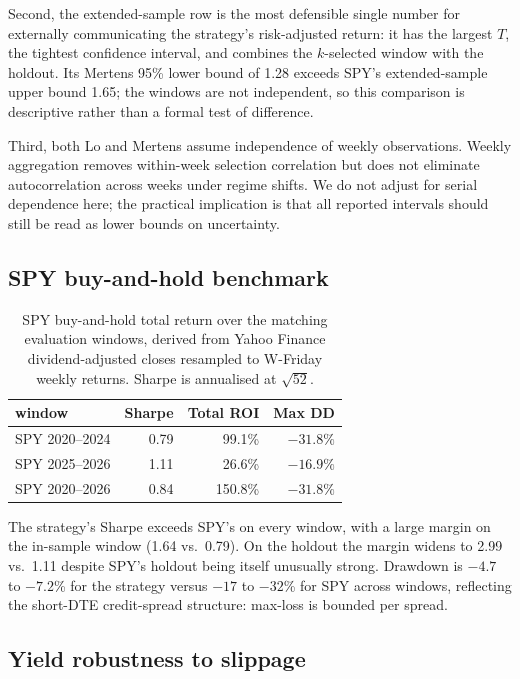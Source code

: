 \documentclass[11pt]{article}
\begin{document}
Second, the extended-sample row is the most defensible single number
for externally communicating the strategy's risk-adjusted return: it
has the largest $T$, the tightest confidence interval, and combines
the $k$-selected window with the holdout. Its Mertens 95\% lower
bound of 1.28 exceeds SPY's extended-sample upper bound 1.65; the
windows are not independent, so this comparison is descriptive rather
than a formal test of difference.

Third, both Lo and Mertens assume independence of weekly observations.
Weekly aggregation removes within-week selection correlation but does
not eliminate autocorrelation across weeks under regime shifts. We do
not adjust for serial dependence here; the practical implication is
that all reported intervals should still be read as lower bounds on
uncertainty.

\subsection{SPY buy-and-hold benchmark}

\begin{table}[htbp]
\centering
\small
\begin{tabular}{lrrr}
\toprule
window & Sharpe & Total ROI & Max DD \\
\midrule
SPY 2020--2024 & 0.79 & 99.1\%  & $-31.8\%$ \\
SPY 2025--2026 & 1.11 & 26.6\%  & $-16.9\%$ \\
SPY 2020--2026 & 0.84 & 150.8\% & $-31.8\%$ \\
\bottomrule
\end{tabular}
\caption{SPY buy-and-hold total return over the matching evaluation
windows, derived from Yahoo Finance dividend-adjusted closes resampled
to W-Friday weekly returns. Sharpe is annualised at $\sqrt{52}$.}
\label{tab:spy-benchmark}
\end{table}

The strategy's Sharpe exceeds SPY's on every window, with a large
margin on the in-sample window (1.64 vs.\ 0.79). On the holdout the
margin widens to 2.99 vs.\ 1.11 despite SPY's holdout being itself
unusually strong. Drawdown is $-4.7$ to $-7.2$\% for the strategy versus
$-17$ to $-32$\% for SPY across windows, reflecting the short-DTE
credit-spread structure: max-loss is bounded per spread.

\subsection{Yield robustness to slippage}
\end{document}
